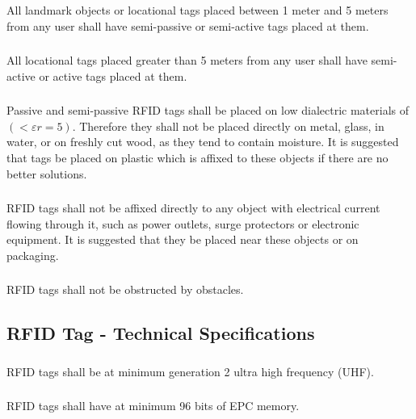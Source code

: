 \documentclass{article}
\begin{document}
\subsubsection{} All landmark objects or locational tags placed between 1 meter and 5 meters from any user shall have semi-passive or semi-active tags placed at them.

\subsubsection{} All locational tags placed greater than 5 meters from any user shall have semi-active or active tags placed at them.

\subsubsection{} Passive and semi-passive RFID tags shall be placed on low dialectric materials of $\left( < \varepsilon r = 5 \right)$. Therefore they shall not be placed directly on metal, glass, in water, or on freshly cut wood, as they tend to contain moisture. It is suggested that tags be placed on plastic which is affixed to these objects if there are no better solutions. 

\subsubsection{} RFID tags shall not be affixed directly to any object with electrical current flowing through it, such as power outlets, surge protectors or electronic equipment. It is suggested that they be placed near these objects or on packaging.

\subsubsection{} RFID tags shall not be obstructed by obstacles.

\subsection{RFID Tag - Technical Specifications}

\subsubsection{} RFID tags shall be at minimum generation 2 ultra high frequency (UHF).

\subsubsection{} RFID tags shall have at minimum 96 bits of EPC memory.
\end{document}
